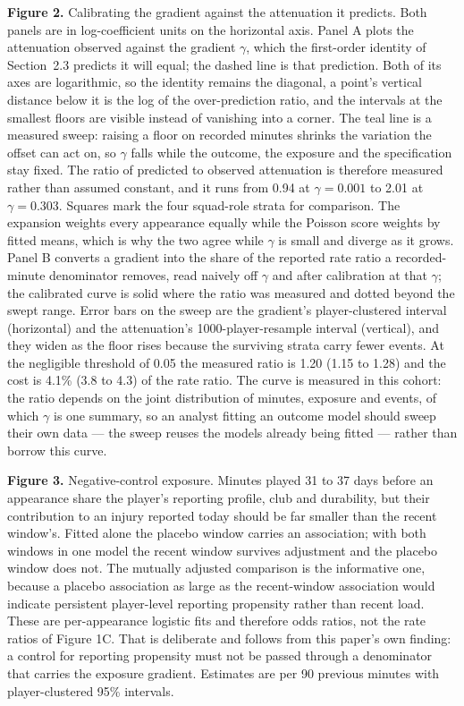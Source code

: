 \documentclass[11pt]{article}
\begin{document}
\vspace{0.6em}

\noindent\textbf{Figure 2.} Calibrating the gradient against the attenuation it predicts. Both panels are in log-coefficient units on the horizontal axis. Panel A plots the attenuation observed against the gradient $\gamma$, which the first-order identity of Section~2.3 predicts it will equal; the dashed line is that prediction. Both of its axes are logarithmic, so the identity remains the diagonal, a point's vertical distance below it is the log of the over-prediction ratio, and the intervals at the smallest floors are visible instead of vanishing into a corner. The teal line is a measured sweep: raising a floor on recorded minutes shrinks the variation the offset can act on, so $\gamma$ falls while the outcome, the exposure and the specification stay fixed. The ratio of predicted to observed attenuation is therefore measured rather than assumed constant, and it runs from 0.94 at $\gamma=0.001$ to 2.01 at $\gamma=0.303$. Squares mark the four squad-role strata for comparison. The expansion weights every appearance equally while the Poisson score weights by fitted means, which is why the two agree while $\gamma$ is small and diverge as it grows. Panel B converts a gradient into the share of the reported rate ratio a recorded-minute denominator removes, read naively off $\gamma$ and after calibration at that $\gamma$; the calibrated curve is solid where the ratio was measured and dotted beyond the swept range. Error bars on the sweep are the gradient's player-clustered interval (horizontal) and the attenuation's 1000-player-resample interval (vertical), and they widen as the floor rises because the surviving strata carry fewer events. At the negligible threshold of 0.05 the measured ratio is 1.20 (1.15 to 1.28) and the cost is 4.1\% (3.8 to 4.3) of the rate ratio. The curve is measured in this cohort: the ratio depends on the joint distribution of minutes, exposure and events, of which $\gamma$ is one summary, so an analyst fitting an outcome model should sweep their own data --- the sweep reuses the models already being fitted --- rather than borrow this curve.

\vspace{0.6em}

\noindent\textbf{Figure 3.} Negative-control exposure. Minutes played 31 to 37 days before an appearance share the player's reporting profile, club and durability, but their contribution to an injury reported today should be far smaller than the recent window's. Fitted alone the placebo window carries an association; with both windows in one model the recent window survives adjustment and the placebo window does not. The mutually adjusted comparison is the informative one, because a placebo association as large as the recent-window association would indicate persistent player-level reporting propensity rather than recent load. These are per-appearance logistic fits and therefore odds ratios, not the rate ratios of Figure 1C. That is deliberate and follows from this paper's own finding: a control for reporting propensity must not be passed through a denominator that carries the exposure gradient. Estimates are per 90 previous minutes with player-clustered 95\% intervals.
\end{document}

